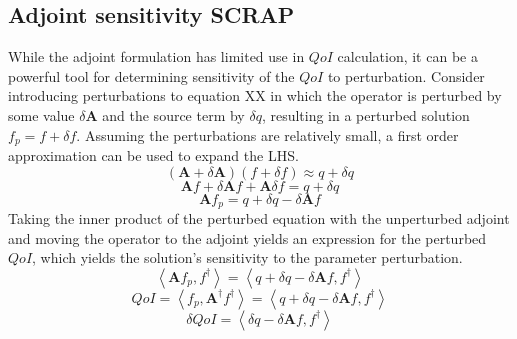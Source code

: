 \documentclass{article}
\newcommand{\bra}{\left\langle}
\newcommand{\ket}{\right\rangle}
\newcommand{\qoi}{QoI}
\begin{document}
\subsection{Adjoint sensitivity SCRAP}
While the adjoint formulation has limited use in $\qoi$ calculation, it can be a powerful tool for determining sensitivity of the $\qoi$ to perturbation. Consider introducing perturbations to equation {\color{red}XX} in which the operator is perturbed by some value $\delta \mathbf{A}$ and the source term by $\delta q$, resulting in a perturbed solution $f_p=f+\delta f$. Assuming the perturbations are relatively small, a first order approximation can be used to expand the LHS.
\begin{equation}
\left( \mathbf{A} + \delta \mathbf{A} \right) \left( f + \delta f \right) \approx q + \delta q 
\end{equation}
\begin{equation}
\mathbf{A} f  + \delta \mathbf{A} f + \mathbf{A}\delta f  = q + \delta q 
\end{equation}
\begin{equation}
\mathbf{A} f_p   = q + \delta q - \delta \mathbf{A} f
\end{equation}
Taking the inner product of the perturbed equation with the unperturbed adjoint and moving the operator to the adjoint yields an expression for the perturbed $\qoi$, which yields the solution's sensitivity to the parameter perturbation.
\begin{equation}
\bra \mathbf{A} f_p , f^\dag \ket  = \bra  q + \delta q - \delta \mathbf{A} f , f^\dag \ket 
\end{equation}
\begin{equation}
\qoi = \bra  f_p , \mathbf{A^\dag} f^\dag \ket  = \bra  q + \delta q - \delta \mathbf{A} f , f^\dag \ket 
\end{equation}
\begin{equation}
\delta \qoi = \bra \delta q - \delta \mathbf{A} f , f^\dag \ket 
\end{equation}

\newpage
\end{document}
